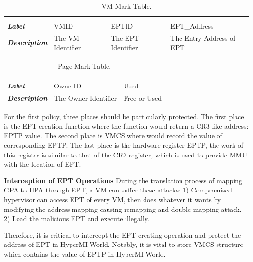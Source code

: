 \documentclass[conference]{IEEEtran}
\begin{document}
\begin{table}[htbp]
\centering
\caption{VM-Mark Table.}\label{tab1}
\begin{tabular}{p{1.4cm}|p{1.2cm}|p{1.1cm}|p{1.7cm}}
\hline
\multicolumn{4}{c}{\bfseries\textbf\centering{VM-Mark Table}}\\
\hline
{\itshape\bfseries Label} & VMID & EPTID & EPT\_Address\\
\hline
{\itshape\bfseries Description} & { The VM Identifier} & The EPT Identifier & The Entry Address of EPT\\
\hline
\end{tabular}
\end{table}

\begin{table}
\centering
\caption{Page-Mark Table.}\label{tab2}
\begin{tabular}{p{1.2cm}|p{1.4cm}|p{1.5cm}}
\hline
\multicolumn{3}{c}{\bfseries\textbf\centering{Page-Mark Table}}\\
\hline
{\itshape\bfseries Label} & OwnerID & Used \\
\hline
{\itshape\bfseries Description} & The Owner Identifier & Free or Used \\
\hline
\end{tabular}
\end{table}

For the first policy, three places should be particularly protected. The first place is the EPT creation function where the function would return a CR3-like address: EPTP value. The second place is VMCS where would record the value of corresponding EPTP. The last place is the hardware register EPTP, the work of this register is similar to that of the CR3 register, which is used to provide MMU with the location of EPT. 

\textbf{Interception of EPT Operations }
During the translation process of mapping GPA to HPA through EPT, a VM can suffer these attacks: 1) Compromised hypervisor can access EPT of every VM, then does whatever it wants by modifying the address mapping causing remapping and double mapping attack. 2) Load the malicious EPT and execute illegally.



Therefore, it is critical to intercept the EPT creating operation and protect the address of EPT in HyperMI World. Notably, it is vital to store VMCS structure which contains the value of EPTP in HyperMI World. 
\end{document}
